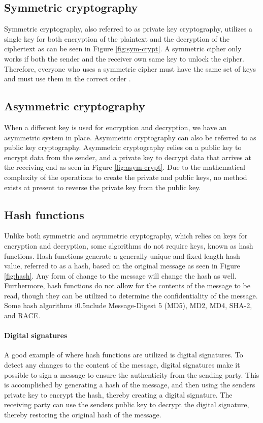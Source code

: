 \subsection{Symmetric cryptography}
Symmetric cryptography, also referred to as private key cryptography, utilizes a single key for both encryption of the plaintext and the decryption of the ciphertext as can be seen in Figure \ref{fig:sym-crypt}. A symmetric cipher only works if both the sender and the receiver own same key to unlock the cipher. Therefore, everyone who uses a symmetric cipher must have the same set of keys and must use them in the correct order \cite{dooley2018history}.

\subsection{Asymmetric cryptography}
When a different key is used for encryption and decryption, we have an asymmetric system in place. Asymmetric cryptography can also be referred to as public key cryptography. Asymmetric cryptography relies on a public key to encrypt data from the sender, and a private key to decrypt data that arrives at the receiving end as seen in Figure \ref{fig:asym-crypt}. Due to the mathematical complexity of the operations to create the private and public keys, no method exists at present to reverse the private key from the public key.

\subsection{Hash functions}
Unlike both symmetric and asymmetric cryptography, which relies on keys for encryption and decryption, some algorithms do not require keys, known as hash functions. Hash functions generate a generally unique and fixed-length hash value, referred to as a hash, based on the original message as seen in Figure \ref{fig:hash}. Any form of change to the message will change the hash as well. Furthermore, hash functions do not allow for the contents of the message to be read, though they can be utilized to determine the confidentiality of the message. Some hash algorithms i0.5nclude Message-Digest 5 (MD5), MD2, MD4, SHA-2, and RACE. 

\paragraph{Digital signatures}
A good example of where hash functions are utilized is digital signatures. To detect any changes to the content of the message, digital signatures make it possible to sign a message to ensure the authenticity from the sending party. This is accomplished by generating a hash of the message, and then using the senders private key to encrypt the hash, thereby creating a digital signature. The receiving party can use the senders public key to decrypt the digital signature, thereby restoring the original hash of the message.

